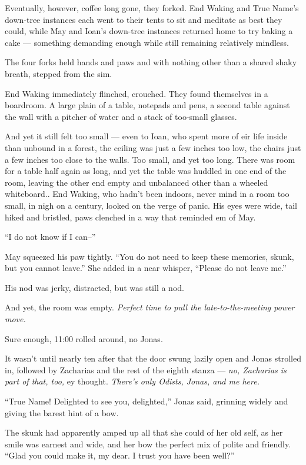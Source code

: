 Eventually, however, coffee long gone, they forked. End Waking and True Name's down-tree instances each went to their tents to sit and meditate as best they could, while May and Ioan's down-tree instances returned home to try baking a cake — something demanding enough while still remaining relatively mindless.

The four forks held hands and paws and with nothing other than a shared shaky breath, stepped from the sim.

End Waking immediately flinched, crouched. They found themselves in a boardroom. A large plain of a table, notepads and pens, a second table against the wall with a pitcher of water and a stack of too-small glasses.

And yet it still felt too small — even to Ioan, who spent more of eir life inside than unbound in a forest, the ceiling was just a few inches too low, the chairs just a few inches too close to the walls. Too small, and yet too long. There was room for a table half again as long, and yet the table was huddled in one end of the room, leaving the other end empty and unbalanced other than a wheeled whiteboard.. End Waking, who hadn't been indoors, never mind in a room too small, in nigh on a century, looked on the verge of panic. His eyes were wide, tail hiked and bristled, paws clenched in a way that reminded em of May.

``I do not know if I can--''

May squeezed his paw tightly. ``You do not need to keep these memories, skunk, but you cannot leave.'' She added in a near whisper, ``Please do not leave me.''

His nod was jerky, distracted, but was still a nod.

And yet, the room was empty. \emph{Perfect time to pull the late-to-the-meeting power move.}

Sure enough, 11:00 rolled around, no Jonas.

It wasn't until nearly ten after that the door swung lazily open and Jonas strolled in, followed by Zacharias and the rest of the eighth stanza — \emph{no, Zacharias is part of that, too,} ey thought. \emph{There's only Odists, Jonas, and me here.}

``True Name! Delighted to see you, delighted,'' Jonas said, grinning widely and giving the barest hint of a bow.

The skunk had apparently amped up all that she could of her old self, as her smile was earnest and wide, and her bow the perfect mix of polite and friendly. ``Glad you could make it, my dear. I trust you have been well?''


